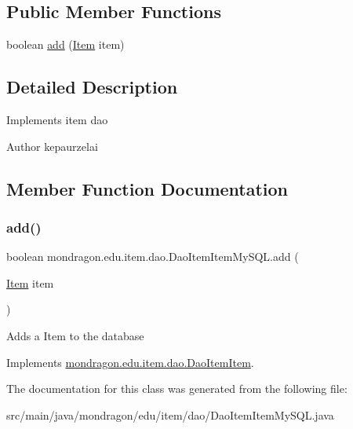 \subsection*{Public Member Functions}
\begin{DoxyCompactItemize}
\item 
boolean \mbox{\hyperlink{classmondragon_1_1edu_1_1item_1_1dao_1_1_dao_item_item_my_s_q_l_ac234eb5659eaef602cff07a4d93e3ab8}{add}} (\mbox{\hyperlink{classmondragon_1_1edu_1_1clases_1_1_item}{Item}} item)
\end{DoxyCompactItemize}


\subsection{Detailed Description}
Implements item dao

\begin{DoxyAuthor}{Author}
kepaurzelai 
\end{DoxyAuthor}


\subsection{Member Function Documentation}
\mbox{\label{classmondragon_1_1edu_1_1item_1_1dao_1_1_dao_item_item_my_s_q_l_ac234eb5659eaef602cff07a4d93e3ab8}} 
\subsubsection{\texorpdfstring{add()}{add()}}
{\footnotesize\ttfamily boolean mondragon.\+edu.\+item.\+dao.\+Dao\+Item\+Item\+My\+S\+Q\+L.\+add (\begin{DoxyParamCaption}\item[{\mbox{\hyperlink{classmondragon_1_1edu_1_1clases_1_1_item}{Item}}}]{item }\end{DoxyParamCaption})\hspace{0.3cm}{\ttfamily [inline]}}

Adds a Item to the database 

Implements \mbox{\hyperlink{interfacemondragon_1_1edu_1_1item_1_1dao_1_1_dao_item_item}{mondragon.\+edu.\+item.\+dao.\+Dao\+Item\+Item}}.



The documentation for this class was generated from the following file\+:\begin{DoxyCompactItemize}
\item 
src/main/java/mondragon/edu/item/dao/Dao\+Item\+Item\+My\+S\+Q\+L.\+java\end{DoxyCompactItemize}
